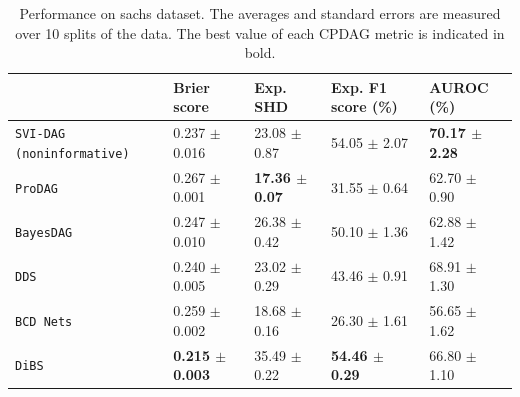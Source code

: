 \begin{table}[ht]
\centering
\caption{Performance on sachs dataset. The averages and standard errors are measured over 10 splits of the data. The best value of each CPDAG metric is indicated in bold.}
\label{tab:sachs_cpdag}
\small
\begin{tabularx}{\linewidth}{XXXXX}
\toprule
 & Brier score & Exp. SHD & Exp. F1 score (\%) & AUROC (\%) \\
\midrule
\texttt{SVI-DAG (noninformative)} & 0.237 $\pm$ 0.016 & 23.08 $\pm$ 0.87 & 54.05 $\pm$ 2.07 & \textbf{70.17 $\pm$ 2.28} \\
\texttt{ProDAG} & 0.267 $\pm$ 0.001 & \textbf{17.36 $\pm$ 0.07} & 31.55 $\pm$ 0.64 & 62.70 $\pm$ 0.90 \\
\texttt{BayesDAG} & 0.247 $\pm$ 0.010 & 26.38 $\pm$ 0.42 & 50.10 $\pm$ 1.36 & 62.88 $\pm$ 1.42 \\
\texttt{DDS} & 0.240 $\pm$ 0.005 & 23.02 $\pm$ 0.29 & 43.46 $\pm$ 0.91 & 68.91 $\pm$ 1.30 \\
\texttt{BCD Nets} & 0.259 $\pm$ 0.002 & 18.68 $\pm$ 0.16 & 26.30 $\pm$ 1.61 & 56.65 $\pm$ 1.62 \\
\texttt{DiBS} & \textbf{0.215 $\pm$ 0.003} & 35.49 $\pm$ 0.22 & \textbf{54.46 $\pm$ 0.29} & 66.80 $\pm$ 1.10 \\
\bottomrule
\end{tabularx}
\end{table}